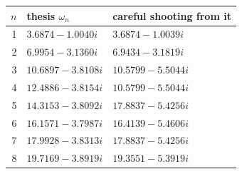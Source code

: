 \begin{tabular}{rll}
\toprule
$n$ & thesis $\omega_n$ & careful shooting from it\\
\midrule
1 & $3.6874-1.0040i$ & $3.6874-1.0039i$ \\
2 & $6.9954-3.1360i$ & $6.9434-3.1819i$ \\
3 & $10.6897-3.8108i$ & $10.5799-5.5044i$ \\
4 & $12.4886-3.8154i$ & $10.5799-5.5044i$ \\
5 & $14.3153-3.8092i$ & $17.8837-5.4256i$ \\
6 & $16.1571-3.7987i$ & $16.4139-5.4606i$ \\
7 & $17.9928-3.8313i$ & $17.8837-5.4256i$ \\
8 & $19.7169-3.8919i$ & $19.3551-5.3919i$ \\
\bottomrule
\end{tabular}
